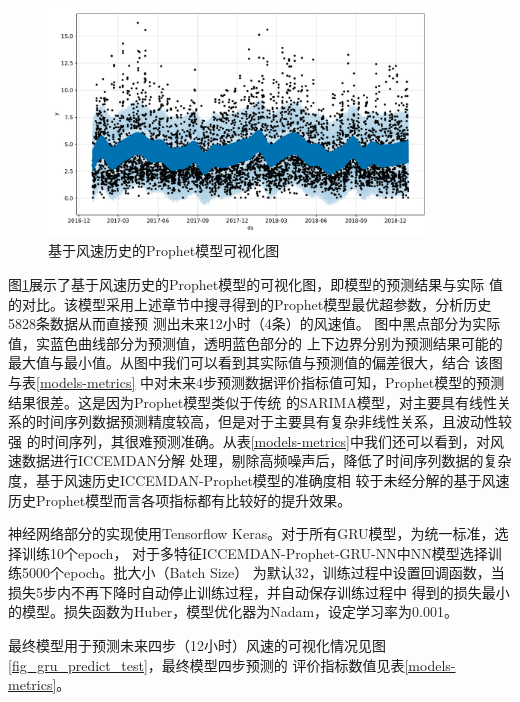 \documentclass[AutoFakeBold]{LZUThesis}
\begin{document}
\begin{figure}[H]
	\centering
    \includegraphics[width=0.9\textwidth]{figures/prophet_wind.pdf}
    \caption{基于风速历史的Prophet模型可视化图}
    \label{fig_prophet_wind}
\end{figure}

图\ref{fig_prophet_wind}展示了基于风速历史的Prophet模型的可视化图，即模型的预测结果与实际
值的对比。该模型采用上述章节中搜寻得到的Prophet模型最优超参数，分析历史5828条数据从而直接预
测出未来12小时（4条）的风速值。
图中黑点部分为实际值，实蓝色曲线部分为预测值，透明蓝色部分的
上下边界分别为预测结果可能的最大值与最小值。从图中我们可以看到其实际值与预测值的偏差很大，结合
该图与表\ref{models-metrics}
中对未来4步预测数据评价指标值可知，Prophet模型的预测结果很差。这是因为Prophet模型类似于传统
的SARIMA模型，对主要具有线性关系的时间序列数据预测精度较高，但是对于主要具有复杂非线性关系，且波动性较强
的时间序列，其很难预测准确。从表\ref{models-metrics}中我们还可以看到，对风速数据进行ICCEMDAN分解
处理，剔除高频噪声后，降低了时间序列数据的复杂度，基于风速历史ICCEMDAN-Prophet模型的准确度相
较于未经分解的基于风速历史Prophet模型而言各项指标都有比较好的提升效果。

神经网络部分的实现使用Tensorflow Keras。对于所有GRU模型，为统一标准，选择训练10个epoch，
对于多特征ICCEMDAN-Prophet-GRU-NN中NN模型选择训练5000个epoch。批大小（Batch Size）
为默认32，训练过程中设置回调函数，当损失5步内不再下降时自动停止训练过程，并自动保存训练过程中
得到的损失最小的模型。损失函数为Huber，模型优化器为Nadam，设定学习率为0.001。

最终模型用于预测未来四步（12小时）风速的可视化情况见图\ref{fig_gru_predict_test}，最终模型四步预测的
评价指标数值见表\ref{models-metrics}。
\end{document}
